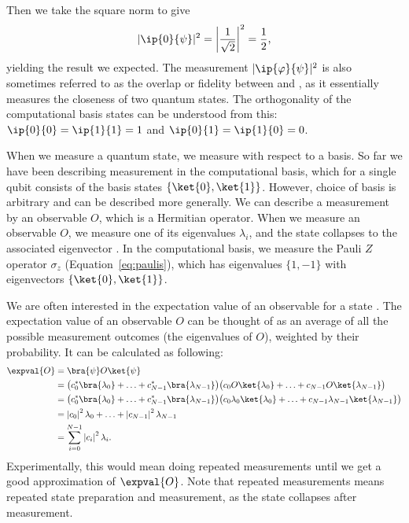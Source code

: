 \documentclass[a4paper,10pt]{article}
\begin{document}
Then we take the square norm to give
\begin{equation}
\lvert \ip{0}{\psi} \rvert^2 = \left\lvert \dfrac{1}{\sqrt2} \right\rvert^2 = \dfrac{1}{2},
\end{equation}
yielding the result we expected.
The measurement $\lvert\ip{\varphi}{\psi}\rvert^2$ is also sometimes referred to as the overlap or fidelity between \ket{\psi} and \ket{\varphi}, as it essentially measures the closeness of two quantum states.
The orthogonality of the computational basis states can be understood from this: $\ip{0}{0} = \ip{1}{1} = 1$ and $\ip{0}{1} = \ip{1}{0} = 0$.

When we measure a quantum state, we measure with respect to a basis.
So far we have been describing measurement in the computational basis, which for a single qubit consists of the basis states $\{\ket{0}, \ket{1}\}$.
However, choice of basis is arbitrary and can be described more generally.
We can describe a measurement by an observable $O$, which is a Hermitian operator.
When we measure an observable $O$, we measure one of its eigenvalues $\lambda_i$, and the state collapses to the associated eigenvector .
In the computational basis, we measure the Pauli $Z$ operator $\sigma_z$ (Equation~\ref{eq:paulis}), which has eigenvalues $\{1, -1\}$ with eigenvectors $\{\ket{0}, \ket{1}\}$.

We are often interested in the expectation value of an observable for a state \ket{\psi}.
The expectation value  of an observable $O$ can be thought of as an average of all the possible measurement outcomes (the eigenvalues of $O$), weighted by their probability.
It can be calculated as following:
\begin{equation}
\begin{aligned}
\expval{O} &= \bra{\psi}O\ket{\psi} \\
&= \big(c_0^*\bra{\lambda_0} + \ldots + c_{N-1}^*\bra{\lambda_{N-1}}\big) \big(c_0O\ket{\lambda_0} + \ldots + c_{N-1}O\ket{\lambda_{N-1}}\big) \\
&= \big(c_0^*\bra{\lambda_0} + \ldots + c_{N-1}^*\bra{\lambda_{N-1}}\big) \big(c_0\lambda_0\ket{\lambda_0} + \ldots + c_{N-1}\lambda_{N-1}\ket{\lambda_{N-1}}\big) \\
&=  \left\lvert c_0\right\rvert^2\lambda_0 + \ldots + \left\lvert c_{N-1}\right\rvert^2 \lambda_{N-1} \\
&= \sum_{i=0}^{N-1} \left\lvert c_i\right\rvert^2\lambda_i.
\end{aligned}
\end{equation}
Experimentally, this would mean doing repeated measurements until we get a good approximation of $\expval{O}$.
Note that repeated measurements means repeated state preparation and measurement, as the state collapses after measurement.
\end{document}
